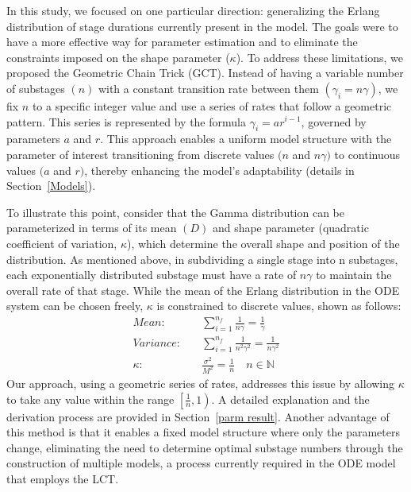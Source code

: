 \documentclass[12pt]{article}
\newcommand{\sref}[1]{Section~\ref{#1}}
\begin{document}
In this study, we focused on one particular direction: generalizing the Erlang distribution of stage durations currently present in the model. The goals were to have a more effective way for parameter estimation and to eliminate the constraints imposed on the shape parameter ($\kappa$). To address these limitations, we proposed the Geometric Chain Trick (GCT). Instead of having a variable number of substages $(n)$ with a constant transition rate between them $(\gamma_i = n\gamma)$, we fix $n$ to a specific integer value and use a series of rates that follow a geometric pattern. This series is represented by the formula $\gamma_i = ar^{i-1}$, governed by parameters $a$ and $r$. This approach enables a uniform model structure with the parameter of interest transitioning from discrete values $(n$ and $n\gamma)$ to continuous values $(a$ and $r)$, thereby enhancing the model's adaptability (details in \sref{Models}).

To illustrate this point, consider that the Gamma distribution can be parameterized in terms of its mean $(D)$ and shape parameter (quadratic coefficient of variation, $\kappa$), which determine the overall shape and position of the distribution. As mentioned above, in subdividing a single stage into n substages, each exponentially distributed substage must have a rate of $n\gamma$ to maintain the overall rate of that stage. While the mean of the Erlang distribution in the ODE system can be chosen freely, $\kappa$ is constrained to discrete values, shown as follows:
\begin{align*}
    Mean: \quad &\sum_{i=1}^{n_f} \frac{1}{n\gamma} = \frac{1}{\gamma}\\
    Variance: \quad &\sum_{i=1}^{n_f} \frac{1}{n^2\gamma^2} = \frac{1}{n\gamma^2} \\
    \kappa: \quad &\frac{\sigma^2}{M^2} = \frac{1}{n} \quad n \in \mathbb{N}
\end{align*}
Our approach, using a geometric series of rates, addresses this issue by allowing $\kappa$ to take any value within the range $\left[ \frac{1}{n}, 1 \right)$. A detailed explanation and the derivation process are provided in \sref{parm result}. Another advantage of this method is that it enables a fixed model structure where only the parameters change, eliminating the need to determine optimal substage numbers through the construction of multiple models, a process currently required in the ODE model that employs the LCT.
\end{document}
